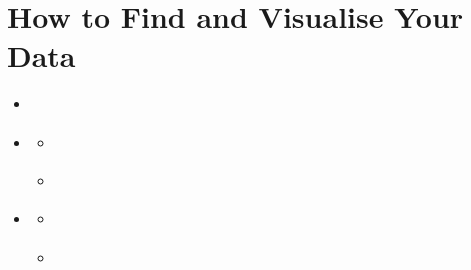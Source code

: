 \documentclass[letterpaper,10pt,english]{sphinxmanual}
\begin{document}
\sphinxstepscope


\section{How to Find and Visualise Your Data}
\label{\detokenize{en/02_find_and_visualize:how-to-find-and-visualise-your-data}}\label{\detokenize{en/02_find_and_visualize:find-en}}\label{\detokenize{en/02_find_and_visualize::doc}}
\begin{sphinxcontents}
\begin{itemize}
\item {} 
\sphinxAtStartPar
{}\label{\detokenize{en/02_find_and_visualize:id1}}{\hyperref[\detokenize{en/02_find_and_visualize:accessing-the-catalogue}]{}}

\item {} 
\sphinxAtStartPar
{}\label{\detokenize{en/02_find_and_visualize:id2}}{\hyperref[\detokenize{en/02_find_and_visualize:filtering-and-searching-the-catalogue}]{}}
\begin{itemize}
\item {} 
\sphinxAtStartPar
{}\label{\detokenize{en/02_find_and_visualize:id3}}{\hyperref[\detokenize{en/02_find_and_visualize:using-the-search-bar}]{}}

\item {} 
\sphinxAtStartPar
{}\label{\detokenize{en/02_find_and_visualize:id4}}{\hyperref[\detokenize{en/02_find_and_visualize:using-filters}]{}}

\end{itemize}

\item {} 
\sphinxAtStartPar
{}\label{\detokenize{en/02_find_and_visualize:id5}}{\hyperref[\detokenize{en/02_find_and_visualize:step-by-step-example-finding-a-pelagos-dataset}]{}}
\begin{itemize}
\item {} 
\sphinxAtStartPar
{}\label{\detokenize{en/02_find_and_visualize:id6}}{\hyperref[\detokenize{en/02_find_and_visualize:step-1-open-the-catalogue}]{}}

\item {} 
\sphinxAtStartPar
{}\label{\detokenize{en/02_find_and_visualize:id7}}{\hyperref[\detokenize{en/02_find_and_visualize:step-2-search-by-keyword}]{}}


\end{itemize}
\end{itemize}
\end{sphinxcontents}
\end{document}
